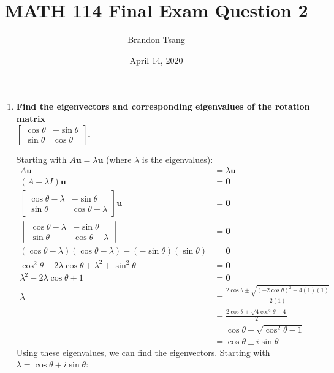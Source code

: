\documentclass[11pt]{article}
\title{MATH 114 Final Exam Question 2}
\author{Brandon Tsang}
\date{April 14, 2020}
\begin{document}
    \maketitle
    \begin{enumerate}[label=\textbf{\arabic*.}, start=2]
        \item{
            \textbf{\boldmath Find the eigenvectors and corresponding eigenvalues of the rotation matrix \\ \(\begin{bmatrix}\cos\theta & -\sin\theta \\ \sin\theta & \cos\theta\end{bmatrix}\).}
            \par
            Starting with \(A\mathbf{u}=\lambda\mathbf{u}\) (where \(\lambda\) is the eigenvalues):
            \begin{align*}
                A\mathbf{u}&=\lambda\mathbf{u} \\
                (A-\lambda I)\mathbf{u}&=\mathbf{0} \\
                \begin{bmatrix}\cos\theta-\lambda & -\sin\theta \\ \sin\theta & \cos\theta-\lambda\end{bmatrix}\mathbf{u}&=\mathbf{0} \\
                \begin{vmatrix}\cos\theta-\lambda & -\sin\theta \\ \sin\theta & \cos\theta-\lambda\end{vmatrix}&=\mathbf{0} \\
                (\cos\theta-\lambda)(\cos\theta-\lambda)-(-\sin\theta)(\sin\theta)&=\mathbf{0} \\
                \cos^2\theta-2\lambda\cos\theta+\lambda^2+\sin^2\theta&=\mathbf{0} \\
                \lambda^2-2\lambda\cos\theta+1&=\mathbf{0} \\
                \lambda&=\frac{2\cos\theta\pm\sqrt{(-2\cos\theta)^2-4(1)(1)}}{2(1)} \\
                &=\frac{2\cos\theta\pm\sqrt{4\cos^2\theta-4}}{2} \\
                &=\cos\theta\pm\sqrt{\cos^2\theta-1} \\
                &=\cos\theta\pm i\sin\theta
            \end{align*}
            Using these eigenvalues, we can find the eigenvectors. Starting with \(\lambda=\cos\theta+i\sin\theta\):
            \begin{align*}

\end{align*}}
\end{enumerate}
\end{document}
